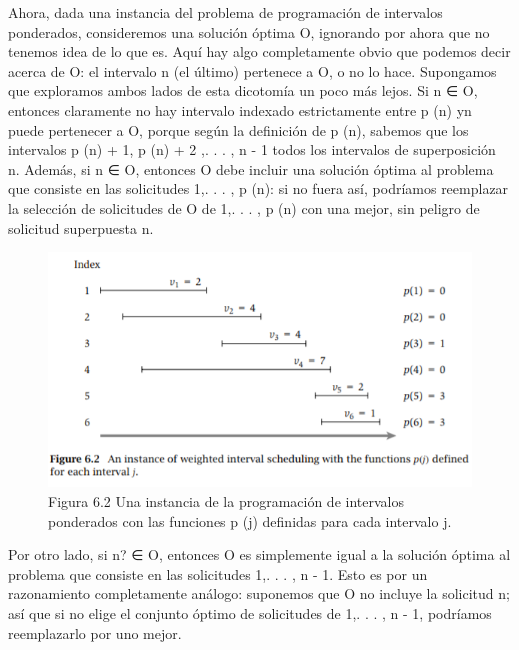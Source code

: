 \documentclass[a4paper]{article}
\begin{document}
Ahora, dada una instancia del problema de programación de intervalos ponderados, consideremos una solución óptima O, ignorando por ahora que no tenemos idea de lo que es. Aquí hay algo completamente obvio que podemos decir acerca de O: el intervalo n (el último) pertenece a O, o no lo hace. Supongamos que exploramos ambos lados de esta dicotomía un poco más lejos. Si n ∈ O, entonces claramente no hay intervalo indexado estrictamente entre p (n) yn puede pertenecer a O, porque según la definición de p (n), sabemos que los intervalos p (n) + 1, p (n) + 2 ,. . . , n - 1 todos los intervalos de superposición n. Además, si n ∈ O, entonces O debe incluir una solución óptima al problema que consiste en las solicitudes {1,. . . , p (n)}: si no fuera así, podríamos reemplazar la selección de solicitudes de O de {1,. . . , p (n)} con una mejor, sin peligro de
solicitud superpuesta n.\\

\begin{figure}[h]
\centering
\includegraphics[scale=1]{Imagenes-Seccion6/fig6_2.PNG}
\caption{Figura 6.2 Una instancia de la programación de intervalos ponderados con las funciones p (j) definidas para cada intervalo j.}
\end{figure}

Por otro lado, si n? ∈ O, entonces O es simplemente igual a la solución óptima al problema que consiste en las solicitudes {1,. . . , n - 1}. Esto es por un razonamiento completamente análogo: suponemos que O no incluye la solicitud n; así que si no elige el conjunto óptimo de solicitudes de {1,. . . , n - 1}, podríamos reemplazarlo por uno mejor.\\
\end{document}
